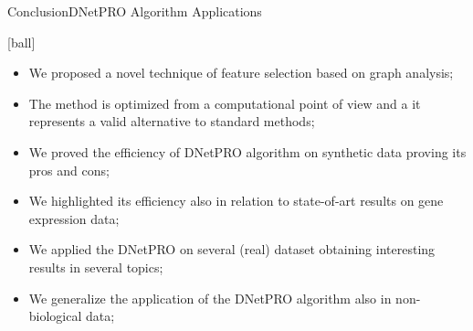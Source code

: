 \documentclass{standalone}
\begin{document}
\begin{frame}{Conclusion}{DNetPRO Algorithm Applications}

  [ball]

  \begin{itemize}

    \item We proposed a novel technique of feature selection based on graph analysis;

    \item The method is optimized from a computational point of view and a it represents a valid alternative to standard methods;

    \item We proved the efficiency of DNetPRO algorithm on synthetic data proving its pros and cons;

    \item We highlighted its efficiency also in relation to state-of-art results on gene expression data;

    \item We applied the DNetPRO on several (real) dataset obtaining interesting results in several topics;

    \item We generalize the application of the DNetPRO algorithm also in non-biological data;

  \end{itemize}

\end{frame}
\end{document}
